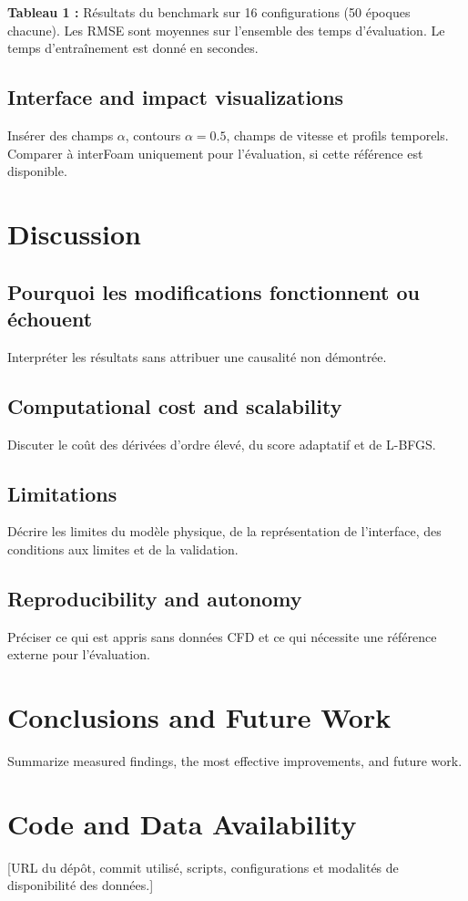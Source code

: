 \documentclass[11pt,a4paper]{article}
\begin{document}
\textbf{Tableau 1 :} Résultats du benchmark sur 16 configurations (50 époques chacune). Les RMSE sont moyennes sur l'ensemble des temps d'évaluation. Le temps d'entraînement est donné en secondes.
\subsection{Interface and impact visualizations}
Insérer des champs $\alpha$, contours $\alpha=0.5$, champs de vitesse et profils temporels. Comparer à interFoam uniquement pour l'évaluation, si cette référence est disponible.

\section{Discussion}
\subsection{Pourquoi les modifications fonctionnent ou échouent}
Interpréter les résultats sans attribuer une causalité non démontrée.
\subsection{Computational cost and scalability}
Discuter le coût des dérivées d'ordre élevé, du score adaptatif et de L-BFGS.
\subsection{Limitations}
Décrire les limites du modèle physique, de la représentation de l'interface, des conditions aux limites et de la validation.
\subsection{Reproducibility and autonomy}
Préciser ce qui est appris sans données CFD et ce qui nécessite une référence externe pour l'évaluation.

\section{Conclusions and Future Work}
Summarize measured findings, the most effective improvements, and future work.

\section*{Code and Data Availability}
[URL du dépôt, commit utilisé, scripts, configurations et modalités de disponibilité des données.]
\end{document}
